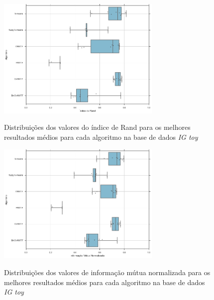 \documentclass[
    12pt,                %
    oneside,            %
    a4paper,            %
    english,            %
    brazil                %
    ]{abntex2ppgsi}
\begin{document}
\begin{figure}[H]
    \centering
    \caption{Distribuições dos valores do índice de Rand para os melhores resultados médios para cada algoritmo na base de dados \textit{IG toy}}
    \includegraphics[width=0.7\textwidth]{img/boxplot-rand-igtoy.png}
    \label{fig:boxplot-rand:igtoy}
\end{figure}

\begin{figure}[H]
    \centering
    \caption{Distribuições dos valores de informação mútua normalizada para os melhores resultados médios para cada algoritmo na base de dados \textit{IG toy}}
    \includegraphics[width=0.7\textwidth]{img/boxplot-nmi-igtoy.png}
    \label{fig:boxplot-nmi:igtoy}
\end{figure}
\end{document}
